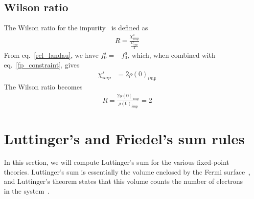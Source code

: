 \subsection{Wilson ratio}
The Wilson ratio for the impurity~\cite{wilson1975,nozieres1974fermi,hewson1993} is defined as
\begin{equation}\begin{aligned}
	R = \frac{\chi^s_{imp}}{\frac{C_{imp}}{T}}
\end{aligned}\end{equation}
From eq.~\eqref{rel_landau}, we have \(f_0^s = -f_0^a\), which, when combined with eq.~\eqref{fp_constraint}, gives
\begin{equation}\begin{aligned}
	\chi^s_{imp} &= 2\rho(0)_{imp}
\end{aligned}\end{equation}
The Wilson ratio becomes
\begin{equation}\begin{aligned}
	R = \frac{2\rho(0)_{imp}}{\rho(0)_{imp}} = 2
\end{aligned}\end{equation}

\section{Luttinger's and Friedel's sum rules}
\label{lutt_theorem}
In this section, we will compute Luttinger's sum for the various fixed-point theories. Luttinger's sum is essentially the volume enclosed by the Fermi surface~\cite{luttinger1960fermi,oshikawa2000topological,seki2017topological}, and Luttinger's theorem states that this volume counts the number of electrons in the system~\cite{luttinger1960fermi,oshikawa2000topological,seki2017topological}.

